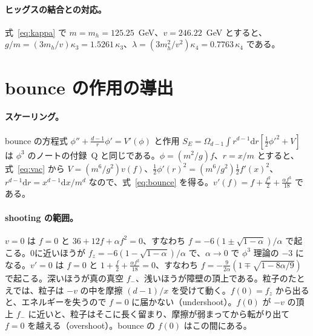 \documentclass[a4paper,10pt]{ltjsarticle}
\newcommand{\dd}{\mathrm{d}}
\begin{document}
\paragraph{ヒッグスの結合との対応。}式~\eqref{eq:kappa} で $m=m_h=125.25$~GeV、$v=246.22$~GeV とすると、$g/m=(3m_h/v)\kappa_3=1.5261\,\kappa_3$、$\lambda=(3m_h^2/v^2)\kappa_4=0.7763\,\kappa_4$ である。

\section{bounce の作用の導出}\label{app:bounce}

\paragraph{スケーリング。}bounce の方程式 $\phi''+\frac{d-1}{r}\phi'=V'(\phi)$ と作用 $S_E=\Omega_{d-1}\int r^{d-1}\dd r[\frac12\phi'^2+V]$ は $\phi^3$ のノートの付録~Q と同じである。$\phi=(m^2/g)f$、$r=x/m$ とすると、式~\eqref{eq:vac} から $V=(m^6/g^2)v(f)$、$\frac12\phi'(r)^2=(m^6/g^2)\frac12f'(x)^2$、$r^{d-1}\dd r=x^{d-1}\dd x/m^d$ なので、式~\eqref{eq:bounce} を得る。$v'(f)=f+\frac{f^2}2+\frac{\alpha f^3}{18}$ である。

\paragraph{shooting の範囲。}$v=0$ は $f=0$ と $36+12f+\alpha f^2=0$、すなわち $f=-6(1\pm\sqrt{1-\alpha})/\alpha$ で起こる。0に近いほうが $f_z=-6(1-\sqrt{1-\alpha})/\alpha$ で、$\alpha\to0$ で $\phi^3$ 理論の $-3$ になる。$v'=0$ は $f=0$ と $1+\frac f2+\frac{\alpha f^2}{18}=0$、すなわち $f=-\frac{9}{2\alpha}(1\mp\sqrt{1-8\alpha/9})$ で起こる。深いほうが真の真空 $f_-$、浅いほうが障壁の頂上である。粒子のたとえでは、粒子は $-v$ の中を摩擦 $(d-1)/x$ を受けて動く。$f(0)=f_z$ から出ると、エネルギーを失うので $f=0$ に届かない（undershoot）。$f(0)$ が $-v$ の頂上 $f_-$ に近いと、粒子はそこに長く留まり、摩擦が弱まってから転がり出て $f=0$ を越える（overshoot）。bounce の $f(0)$ はこの間にある。
\end{document}
